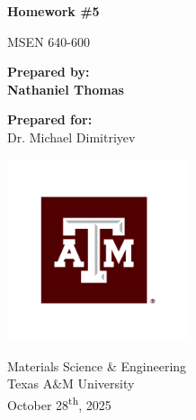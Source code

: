 \thispagestyle{empty}

\begin{titlepage}
  \begin{center}
    \vspace*{2cm}

    \Huge
    \textbf{Homework \#5}

    \vspace{0.8cm}

    \LARGE
    MSEN 640-600

    \vspace{2cm}

    \Large
    \textbf{Prepared by:}\\[0.5cm]
    \huge
    \textbf{Nathaniel Thomas}

    \vspace{1cm}

    \Large
    \textbf{Prepared for:}\\[0.5cm]
    \large
    Dr. Michael Dimitriyev

    \vfill

    \includegraphics[width=0.4\textwidth]{"./assets/a&m_logo.pdf"}

    \vspace{1cm}

    \Large
    Materials Science \& Engineering\\
    Texas A\&M University\\
    \vspace{0.5cm}
    \large
    October 28\textsuperscript{th}, 2025

  \end{center}
\end{titlepage}

\lfoot{}
\cfoot{\thepage}
\rfoot{}

\headrule
